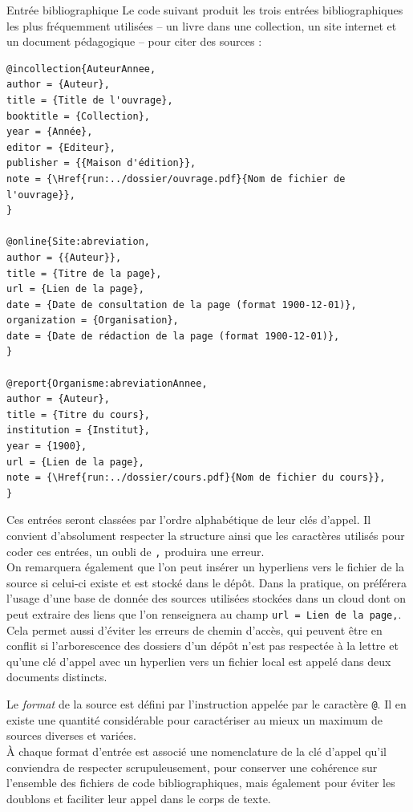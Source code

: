 \documentclass[a4paper, 11pt, twoside, fleqn]{memoir}
\begin{document}
\begin{exemple}{Entrée bibliographique}{}
Le code suivant produit les trois entrées bibliographiques les plus fréquemment utilisées -- un livre dans une collection, un site internet et un document pédagogique -- pour citer des sources :

\begin{verbatim}
@incollection{AuteurAnnee,
author = {Auteur},
title = {Title de l'ouvrage},
booktitle = {Collection},
year = {Année},
editor = {Editeur},
publisher = {{Maison d'édition}},
note = {\Href{run:../dossier/ouvrage.pdf}{Nom de fichier de l'ouvrage}},
}

@online{Site:abreviation,
author = {{Auteur}},
title = {Titre de la page},
url = {Lien de la page},
date = {Date de consultation de la page (format 1900-12-01)},
organization = {Organisation},
date = {Date de rédaction de la page (format 1900-12-01)},
}

@report{Organisme:abreviationAnnee,
author = {Auteur},
title = {Titre du cours},
institution = {Institut},
year = {1900},
url = {Lien de la page},
note = {\Href{run:../dossier/cours.pdf}{Nom de fichier du cours}},
}
\end{verbatim}

Ces entrées seront classées par l'ordre alphabétique de leur clés d'appel. Il convient d'absolument respecter la structure ainsi que les caractères utilisés pour coder ces entrées, un oubli de \texttt{,} produira une erreur.\\

On remarquera également que l'on peut insérer un hyperliens vers le fichier de la source si celui-ci existe et est stocké dans le dépôt. Dans la pratique, on préférera l'usage d'une base de donnée des sources utilisées stockées dans un cloud dont on peut extraire des liens que l'on renseignera au champ \texttt{url = {Lien de la page},}. Cela permet aussi d'éviter les erreurs de chemin d'accès, qui peuvent être en conflit si l'arborescence des dossiers d'un dépôt n'est pas respectée à la lettre et qu'une clé d'appel avec un hyperlien vers un fichier local est appelé dans deux documents distincts. 
\end{exemple}

Le \emph{format} de la source est défini par l'instruction appelée par le caractère \texttt{@}. Il en existe une quantité considérable pour caractériser au mieux un maximum de sources diverses et variées.\\
À chaque format d'entrée est associé une nomenclature de la clé d'appel qu'il conviendra de respecter scrupuleusement, pour conserver une cohérence sur l'ensemble des fichiers de code bibliographiques, mais également pour éviter les doublons et faciliter leur appel dans le corps de texte.\\
\end{document}
